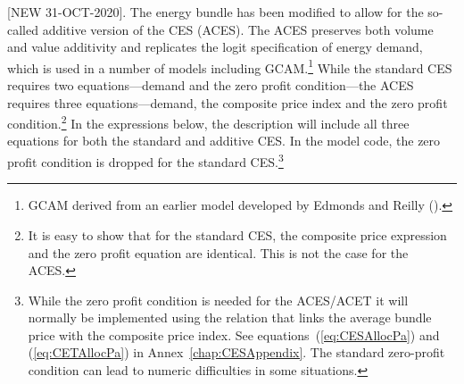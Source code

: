 \documentclass[11pt,letterpaper]{report}
\begin{document}
[NEW 31-OCT-2020]. The energy bundle has been modified to allow for
the so-called additive version of the CES (ACES). The ACES preserves
both volume and value additivity and replicates the logit specification
of energy demand, which is used in a number of models including
GCAM.\footnote{GCAM derived from an earlier model developed
by Edmonds and Reilly (\cite{EdmondsReilly1985}).} While the standard CES
requires two equations---demand and the zero profit condition---the ACES
requires three equations---demand, the composite price index and the
zero profit condition.\footnote{It is easy to show that for the standard
CES, the composite price expression and the zero profit equation are
identical. This is not the case for the ACES.} In the expressions below,
the description will include all three equations for both the standard
and additive CES. In the model code, the zero profit condition
is dropped for the standard CES.\footnote{While the zero profit
condition is needed for the ACES/ACET it will normally be implemented
using the relation that links the average bundle price with the
composite price index. See equations~(\ref{eq:CESAllocPa})
and (\ref{eq:CETAllocPa}) in Annex~\ref{chap:CESAppendix}. The standard
zero-profit condition can lead to numeric difficulties in some
situations.}
\end{document}
